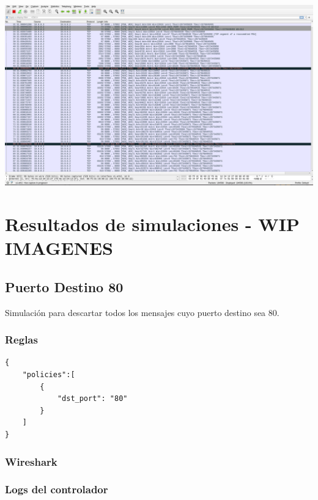 \documentclass{article}
\begin{document}
\begin{center}
\includegraphics[scale=0.2]{iperfTCP.png}

\end{center}

\section{Resultados de simulaciones - WIP IMAGENES}\label{pruebas-wip}

\subsection{Puerto Destino 80}
Simulación para descartar todos los mensajes cuyo puerto destino sea 80.

\subsubsection{Reglas}
\begin{verbatim}
{
    "policies":[
        {
            "dst_port": "80"
        }
    ]
}
\end{verbatim}

\subsubsection{Wireshark}
\begin{center}
\end{center}

\subsubsection{Logs del controlador}
\end{document}
